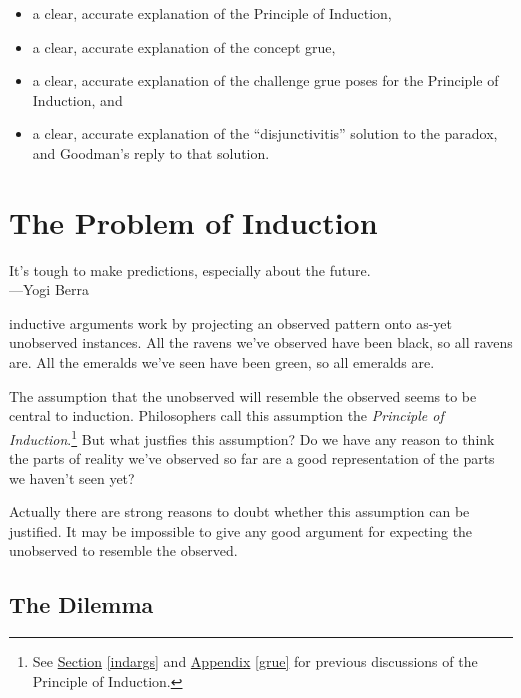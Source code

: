 \documentclass[justified]{tufte-book}
\providecommand{\tightlist}{%
  \setlength{\itemsep}{0pt}\setlength{\parskip}{0pt}}
\newenvironment{epigraph}%
{
\begin{flushright}    
\begin{minipage}{20em}
\begin{flushright}
\itshape
}%
{
\end{flushright}
\end{minipage}
\end{flushright}
}
\theoremstyle{definition}
\theoremstyle{definition}
\theoremstyle{definition}
\theoremstyle{definition}
\theoremstyle{remark}
\begin{document}
\begin{enumerate}
  \begin{itemize}
  \tightlist
  \item
    a clear, accurate explanation of the Principle of Induction,
  \item
    a clear, accurate explanation of the concept grue,
  \item
    a clear, accurate explanation of the challenge grue poses for the Principle of Induction, and
  \item
    a clear, accurate explanation of the ``disjunctivitis'' solution to the paradox, and Goodman's reply to that solution.
  \end{itemize}
\end{enumerate}

\hypertarget{the-problem-of-induction}{%
\chapter{The Problem of Induction}\label{the-problem-of-induction}}

\begin{epigraph}
It's tough to make predictions, especially about the future.\\
---Yogi Berra
\end{epigraph}

 inductive arguments work by projecting an observed pattern onto as-yet unobserved instances. All the ravens we've observed have been black, so all ravens are. All the emeralds we've seen have been green, so all emeralds are.

The assumption that the unobserved will resemble the observed seems to be central to induction. Philosophers call this assumption the \emph{Principle of Induction}.\footnote{See \protect\hyperlink{indargs}{Section} \ref{indargs} and \protect\hyperlink{grue}{Appendix} \ref{grue} for previous discussions of the Principle of Induction.} But what justfies this assumption? Do we have any reason to think the parts of reality we've observed so far are a good representation of the parts we haven't seen yet?

Actually there are strong reasons to doubt whether this assumption can be justified. It may be impossible to give any good argument for expecting the unobserved to resemble the observed.

\hypertarget{the-dilemma}{%
\section*{The Dilemma}\label{the-dilemma}}
\end{document}
